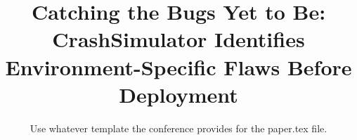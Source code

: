 \documentclass{sig-alternate}
\begin{document}

\title{Catching the Bugs Yet to Be: CrashSimulator Identifies
Environment-Specific Flaws Before Deployment}


\newcommand{\showurlx}{[redacted]}

\author{
Use whatever template the conference provides for the paper.tex file.
}

\maketitle



% 


% 






{\footnotesize 
}
\end{document}
